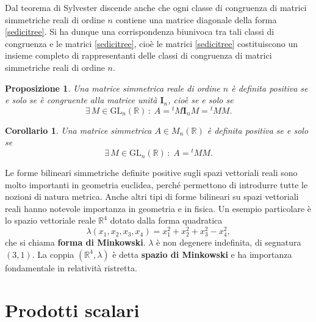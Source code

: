\documentclass{article}
\theoremstyle{plain}
\newtheorem{prop}[thm]{Proposizione}
\newtheorem{cor}{Corollario}
\theoremstyle{definition}
\theoremstyle{remark}
\begin{document}
Dal teorema di Sylvester discende anche che ogni classe di congruenza di matrici simmetriche reali di ordine $n$ contiene una 
matrice diagonale della forma \ref{sedicitree}. Si ha dunque una corrispondenza biunivoca tra tali classi di congruenza 
e le matrici \ref{sedicitree}, cioè le matrici \ref{sedicitree} costituiscono un insieme completo di rappresentanti delle 
classi di congruenza di matrici simmetriche reali di ordine $n$.

\vspace{10pt}

\begin{bxthm}
\begin{prop}
Una matrice simmetrica reale di ordine $n$ è definita positiva se e solo se è congruente alla matrice unità $\mathbf{I}_n$, 
cioè se e solo se 
\[\exists\,M \in \mathrm{GL}_n(\mathbb{R})\,:\;A = {}^tM \mathbf{I}_n M = {}^tMM.\]
\end{prop}
\end{bxthm}

\vspace{10pt}

\begin{bxthm}
\begin{cor}
    Una matrice simmetrica $A \in M_n(\mathbb{R})$ è definita positiva se e solo se 
    \[\exists\,M \in \mathrm{GL}_n(\mathbb{R})\,:\;A = {}^tMM.\]
\end{cor}
\end{bxthm}

\vspace{10pt}

Le forme bilineari simmetriche definite positive sugli spazi vettoriali reali sono molto importanti in geometria euclidea, perché permettono di introdurre tutte le nozioni di natura metrica. Anche altri tipi di forme bilineari su spazi vettoriali reali hanno notevole importanza in geometria e in fisica. Un esempio particolare è lo spazio vettoriale reale $\mathbb{R}^4$ dotato dalla forma quadratica
\[\lambda(x_1, x_2, x_3, x_4) = x_1^2 + x_2^2 + x_3^2 - x_4^2,\]
che si chiama \textbf{forma di Minkowski}. $\lambda$ è non degenere indefinita, di segnatura $(3, 1)$. 
La coppia $(\mathbb{R}^4, \lambda)$ è detta \textbf{spazio di Minkowski} e ha importanza fondamentale in relatività ristretta.

\newpage
\section{Prodotti scalari}
\vspace{20pt}
\end{document}
